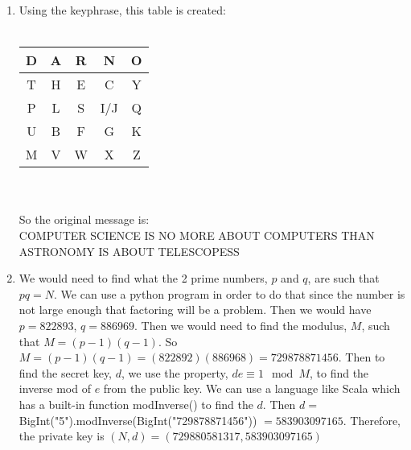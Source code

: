 \documentclass{article}
\begin{document}
\begin{enumerate}
		\item
			Using the keyphrase, this table is created: \\ \\
			\begin{tabular} {| c | c | c | c | c |}
				\hline
				D & A & R & N & O \\ \hline
				T & H & E & C & Y \\ \hline
				P & L & S & I/J & Q \\ \hline
				U & B & F & G & K \\ \hline
				M & V & W & X & Z \\ \hline
			\end{tabular}
			\\
			\\
			So the original message is: \\
			COMPUTER SCIENCE IS NO MORE ABOUT COMPUTERS THAN ASTRONOMY IS ABOUT TELESCOPESS
			\\
		
		\item
			We would need to find what the 2 prime numbers, $p$ and $q$, are such that $pq = N$. We can use a python program in order to do that since the number is not large enough that factoring will be a problem. Then we would have $p = 822893$, $q = 886969$. Then we would need to find the modulus, $M$, such that $M = (p-1)(q-1)$. So $M = (p-1)(q-1) = (822892)(886968) = 729878871456$. Then to find the secret key, $d$, we use the property,  $de \equiv1\mod M$, to find the inverse mod of $e$ from the public key. We can use a language like Scala which has a built-in function modInverse() to find the $d$. Then $d = $ BigInt("5").modInverse(BigInt("729878871456")) $ = 583903097165$. Therefore, the private key is $(N,d) = (729880581317,583903097165)$
			\\
									

\end{enumerate}
\end{document}
